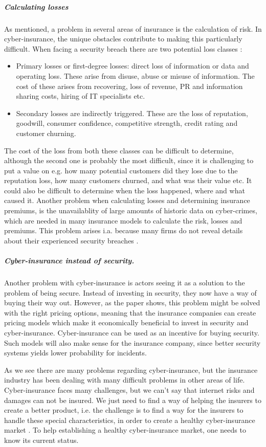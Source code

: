 \subparagraph{Calculating losses} As mentioned, a problem in several areas of insurance is the calculation of risk. In cyber-insurance, the unique obstacles contribute to making this particularly difficult. When facing a security breach there are two potential loss classes \cite{bandyopadhyay2009managers,mehr1980principles}:
\begin{itemize}
\item Primary losses or first-degree losses: direct loss of information or data and operating loss. 
These arise from disuse, abuse or misuse of information.
 The cost of these arises from recovering, loss of revenue, 
 PR and information sharing costs, hiring of IT specialists etc.
 \item Secondary losses are indirectly triggered. These are the loss of reputation, goodwill, 
consumer confidence, competitive strength, credit rating and customer churning. 
\end{itemize}
The cost of the loss from both these classes can be difficult to determine, although the second one is probably the most difficult, since it is challenging to put a value on e.g. how many potential customers did they lose due to the reputation loss, how many customers churned, and what was their value etc.
It could also be difficult to determine when the loss happened, where and what caused it.
Another problem when calculating losses and determining insurance premiums, is the unavailablity of large amounts of historic data on cyber-crimes, which are needed in many insurance models to calculate the risk, losses and premiums. This problem arises i.a. because many firms do not reveal details about their experienced security breaches \cite{herath2007cyber}. 

\subparagraph{Cyber-insurance instead of security.}
Another problem with cyber-insurance is actors seeing it as a solution to the problem of being secure. Instead of investing in security, they now have a way of buying their way out. 
However, as the paper \cite{bolot2008cyber} shows, this problem might be solved with the right pricing options, meaning that the insurance companies can create pricing models which make it economically beneficial to invest in security and cyber-insurance. Cyber-insurance can be used as an incentive for buying security. Such models will also make sense for the insurance company, since better security systems yields lower probability for incidents.

As we see there are many problems regarding cyber-insurance, but the insurance industry has been dealing with many difficult problems in other areas of life. Cyber-insurance faces many challenges, but we can't say that internet risks and damages can not be insured. We just need to find a way of helping the insurers to create a better product, i.e. the challenge is to find a way for the insurers to handle these special characteristics, in order to create a healthy cyber-insurance market \cite{lelarge2009economic}.
To help establishing a healthy cyber-insurance market, one needs to know its current status.

